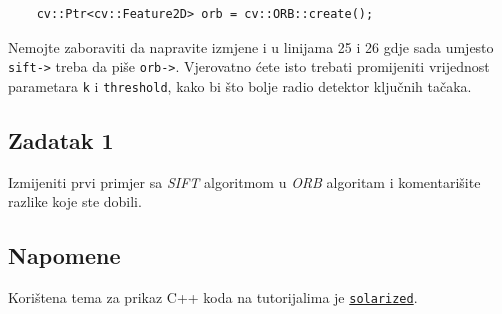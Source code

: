 \documentclass[a4paper, 12pt]{article}
\begin{document}
\begin{lstlisting}
    cv::Ptr<cv::Feature2D> orb = cv::ORB::create();
\end{lstlisting}

Nemojte zaboraviti da napravite izmjene i u linijama 25 i 26 gdje sada umjesto \lstinline{sift->} treba da piše \lstinline{orb->}. Vjerovatno ćete isto trebati promijeniti vrijednost parametara \lstinline{k} i \lstinline{threshold}, kako bi što bolje radio detektor ključnih tačaka.

\subsection*{Zadatak 1}

Izmijeniti prvi primjer sa \textit{SIFT} algoritmom u \textit{ORB} algoritam i komentarišite razlike koje ste dobili.

\subsection*{Napomene}

Korištena tema za prikaz C++ koda na tutorijalima je \href{https://ethanschoonover.com/solarized/}{\lstinline{solarized}}\cite{solarized}.

\printbibliography
\end{document}
